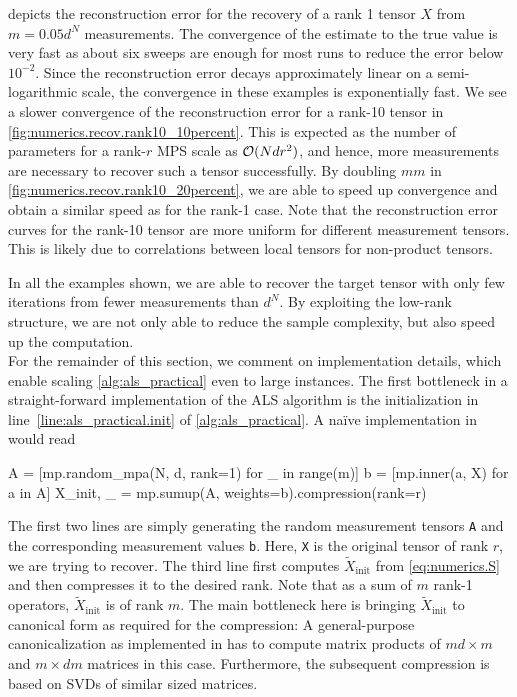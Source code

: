  depicts the reconstruction error for the recovery of a rank 1 tensor $X$ from $m = 0.05 d^N$ measurements.
The convergence of the estimate to the true value is very fast as about six sweeps are enough for most runs to reduce the error below $10^{-2}$.
Since the reconstruction error decays approximately linear on a semi-logarithmic scale, the convergence in these examples is exponentially fast.
We see a slower convergence of the reconstruction error for a rank-10 tensor in \cref{fig:numerics.recov.rank10_10percent}.
This is expected as the number of parameters for a rank-$r$ MPS scale as ${\mathcal{O}}(N d r^2)$, and hence, more measurements are necessary to recover such a tensor successfully.
By doubling $mm$ in \cref{fig:numerics.recov.rank10_20percent}, we are able to speed up convergence and obtain a similar speed as for the rank-1 case.
Note that the reconstruction error curves for the rank-10 tensor are more uniform for different measurement tensors.
This is likely due to correlations between local tensors for non-product tensors.

In all the examples shown, we are able to recover the target tensor with only few iterations from fewer measurements than $d^N$.
By exploiting the low-rank structure, we are not only able to reduce the sample complexity, but also speed up the computation.\\



For the remainder of this section, we comment on implementation details, which enable scaling \cref{alg:als_practical} even to large instances.
The first bottleneck in a straight-forward implementation of the ALS algorithm is the initialization in line~\ref{line:als_practical.init} of \cref{alg:als_practical}.
A na\"ive implementation in \mpnum would read
\begin{pythoncode}
  A = [mp.random_mpa(N, d, rank=1) for _ in range(m)]
  b = [mp.inner(a, X) for a in A]
  X_init, _ = mp.sumup(A, weights=b).compression(rank=r)
\end{pythoncode}
The first two lines are simply generating the random measurement tensors \texttt{A} and the corresponding measurement values \texttt{b}.
Here, \texttt{X} is the original tensor of rank $r$, we are trying to recover.
The third line first computes $\tilde X_\mathrm{init}$ from \cref{eq:numerics.S} and then compresses it to the desired rank.
Note that as a sum of $m$ rank-1 operators, $\tilde X_\mathrm{init}$ is of rank $m$.
The main bottleneck here is bringing $\tilde X_\mathrm{init}$ to canonical form as required for the compression:
A general-purpose canonicalization as implemented in \mpnum has to compute matrix products of $m d \times m$ and $m \times d m$ matrices in this case.
Furthermore, the subsequent compression is based on SVDs of similar sized matrices.

